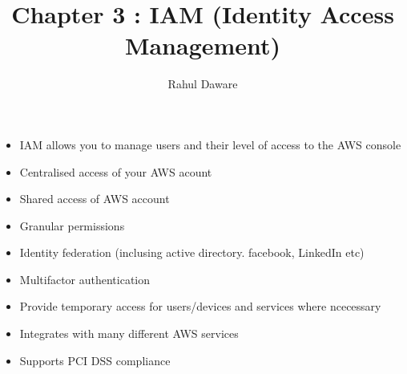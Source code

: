 \documentclass{report}
\author{Rahul Daware}
\begin{document}
    \title{Chapter 3 : IAM (Identity Access Management)}
    \maketitle
    
    \begin{itemize}
  
  	\section*{Features}
    \item
 	IAM allows you to manage users and their level of access to the AWS console
 	
 	\item
 	Centralised access of your AWS acount
 	
 	\item
 	Shared access of AWS account
 	
 	\item
 	Granular permissions
 	
 	\item
 	Identity federation (inclusing active directory. facebook, LinkedIn etc)
 	
 	\item
 	Multifactor authentication
 	
 	\item
 	Provide temporary access for users/devices and services where ncecessary
 	
 	\item
 	Integrates with many different AWS services
 	
 	\item
 	Supports PCI DSS compliance
    \end{itemize}
    
    
\end{document}

